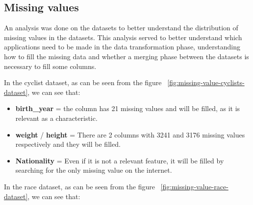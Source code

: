 \documentclass[a4paper, twoside]{article}
\begin{document}
\subsection{Missing values}

An analysis was done on the datasets to better understand the distribution of missing values in the datasets. This analysis served to better understand which applications need to be made in the data transformation phase, understanding how to fill the missing data and whether a merging phase between the datasets is necessary to fill some columns.

In the cyclist dataset, as can be seen from the figure  ~\ref{fig:missing-value-cyclists-dataset}, we can see that:
\begin{itemize}[noitemsep]

    \item \textbf{birth\_year} = the column has 21 missing values and will be filled, as it is relevant as a characteristic.

    \item \textbf{weight} / \textbf{height} = There are 2 columns with 3241 and 3176 missing values respectively and they will be filled.

    \item \textbf{Nationality} = Even if it is not a relevant feature, it will be filled by searching for the only missing value on the internet.

\end{itemize}
In the race dataset, as can be seen from the figure ~\ref{fig:missing-value-race-dataset}, we can see that:
\end{document}
